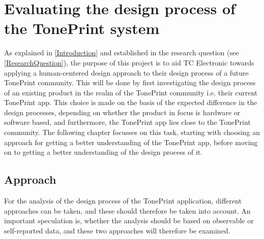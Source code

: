 \chapter{Evaluating the design process of the TonePrint system}
\label{HeuristicEvaluation}
As explained in \autoref{Introduction} and established in the research question (see \autoref{ResearchQuestion}), the purpose of this project is to aid TC Electronic towards applying a human-centered design approach to their design process of a future TonePrint community. This will be done by first investigating the design process of an existing product in the realm of the TonePrint community i.e. their current TonePrint app. This choice is made on the basis of the expected difference in the design processes, depending on whether the product in focus is hardware or software based, and furthermore, the TonePrint app lies close to the TonePrint community. The following chapter focusses on this task, starting with choosing an approach for getting a better understanding of the TonePrint app, before moving on to getting a better understanding of the design process of it.

\section{Approach}
\label{AnalyzingTonePrintDesign}
For the analysis of the design process of the TonePrint application, different approaches can be taken, and these should therefore be taken into account. An important speculation is, whether the analysis should be based on observable or self-reported data, and these two approaches will therefore be examined.


